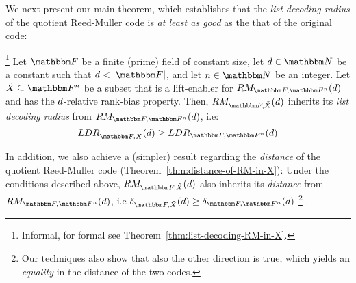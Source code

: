 We next present our main theorem, which establishes that the \emph{list decoding radius} of the quotient Reed-Muller code is \emph{at least as good} as the that of the original code:
\begin{theorem*}
\footnote{Informal, for formal see Theorem~\ref{thm:list-decoding-RM-in-X}.}
Let $\basefield$ be a finite (prime) field of constant size, let $\degree \in \naturalnumbersset$ be a constant such that $\degree < \abs{\basefield}$,
and let $\blocklength \in \naturalnumbersset$ be an integer.
\newline
Let $\variety \subseteq \field$ be a subset that is a lift-enabler for $\reedmullercodeex{\basefield}{\field}{\degree}$ and has the $d$-relative rank-bias property.
\newline
Then, $\reedmullercodeex{\basefield}{\variety}{\degree}$ inherits its \emph{list decoding radius} from $\reedmullercodeex{\basefield}{\field}{\degree}$, i.e:
\[
    \listdecodingradiusex{\basefield}{\variety}{\degree} \geq \listdecodingradiusex{\basefield}{\field}{\degree}
\]
\end{theorem*}

In addition, we also achieve a (simpler) result regarding the \emph{distance} of the quotient Reed-Muller code (Theorem~\ref{thm:distance-of-RM-in-X}):
Under the conditions described above,
$\reedmullercodeex{\basefield}{\variety}{\degree}$ also inherits its \emph{distance} from $\reedmullercodeex{\basefield}{\field}{\degree}$, i.e
$\normalizedcodedistanceex{\basefield}{\variety}{\degree} \geq \normalizedcodedistanceex{\basefield}{\field}{\degree}$
\footnote{Our techniques also show that also the other direction is true, which yields an \emph{equality} in the distance of the two codes.}
.

